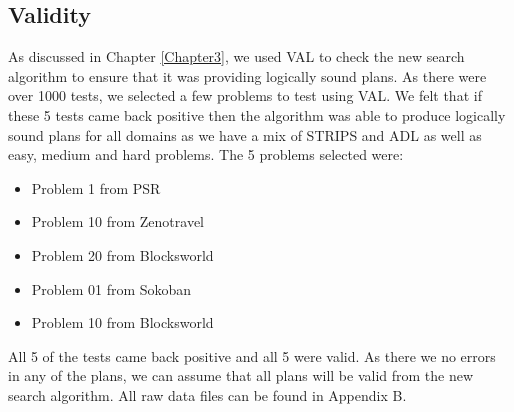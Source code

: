 \subsection{Validity}
As discussed in Chapter \ref{Chapter3}, we used VAL\cite{VAL} to check the new search algorithm to ensure that it was providing logically sound plans. As there were over 1000 tests, we selected a few problems to test using VAL. We felt that if these 5 tests came back positive then the algorithm was able to produce logically sound plans for all domains as we have a mix of STRIPS and ADL as well as easy, medium and hard problems. 
The 5 problems selected were:
\begin{itemize}
\item Problem 1 from PSR
\item Problem 10 from Zenotravel
\item Problem 20 from Blocksworld
\item Problem 01 from Sokoban
\item Problem 10 from Blocksworld
\end{itemize} 
All 5 of the tests came back positive and all 5 were valid. As there we no errors in any of the plans, we can assume that all plans will be valid from the new search algorithm.  
All raw data files can be found in Appendix B.
